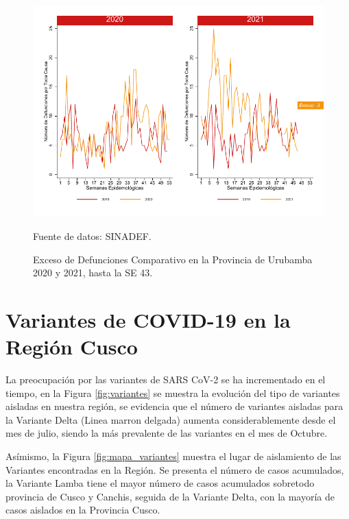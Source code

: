 \documentclass[12pt,a4paper,openany]{book}
\begin{document}
		\begin{figure}[h]
			\caption{Exceso de Defunciones Comparativo en la Provincia de Urubamba 2020 y 2021, hasta la SE 43.}\label{fig:exceso_urub}
			\begin{center}
				\includegraphics[width=0.7\linewidth]{../figuras/exceso_13}
			\end{center}
			{\footnotesize {Fuente de datos: SINADEF.}}
		\end{figure}
		
		\clearpage
		
		\clearpage
		
		\section* {Variantes de COVID-19 en la Región Cusco}
		\noindent La preocupación por las variantes de SARS CoV-2 se ha incrementado en el tiempo, en la Figura \ref{fig:variantes} se muestra la evolución del tipo de variantes aisladas en nuestra región, se evidencia que el número de variantes aisladas para la Variante Delta (Linea marron delgada) aumenta considerablemente desde el mes de julio, siendo la más prevalente de las variantes en el mes de Octubre. 


Asímismo, la Figura \ref{fig:mapa_variantes}  muestra el lugar de aislamiento de las Variantes encontradas en la Región. Se presenta el número de casos acumulados, la Variante Lamba tiene el mayor número de casos acumulados sobretodo provincia de Cusco y Canchis, seguida de la Variante Delta, con la mayoría de casos aislados en la Provincia Cusco. 
		
\end{document}
